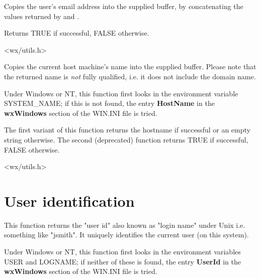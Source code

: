 Copies the user's email address into the supplied buffer, by
concatenating the values returned by \rtfsp
and .

Returns TRUE if successful, FALSE otherwise.


<wx/utils.h>

\label{wxgethostname}



Copies the current host machine's name into the supplied buffer. Please note
that the returned name is {\it not} fully qualified, i.e. it does not include
the domain name.

Under Windows or NT, this function first looks in the environment
variable SYSTEM\_NAME; if this is not found, the entry {\bf HostName}\rtfsp
in the {\bf wxWindows} section of the WIN.INI file is tried.

The first variant of this function returns the hostname if successful or an
empty string otherwise. The second (deprecated) function returns TRUE
if successful, FALSE otherwise.




<wx/utils.h>

\section{User identification}\label{useridfunctions}

\label{wxgetuserid}



This function returns the "user id" also known as "login name" under Unix i.e.
something like "jsmith". It uniquely identifies the current user (on this system).

Under Windows or NT, this function first looks in the environment
variables USER and LOGNAME; if neither of these is found, the entry {\bf UserId}\rtfsp
in the {\bf wxWindows} section of the WIN.INI file is tried.

